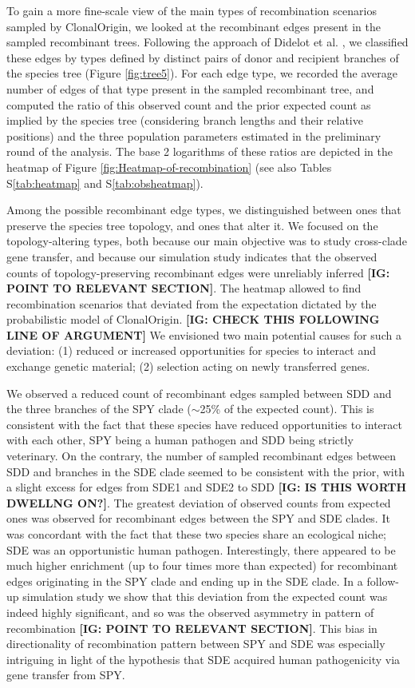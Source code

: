 \documentclass[10pt]{article}
\begin{document}
To gain a more fine-scale view of the main types of recombination scenarios
sampled by ClonalOrigin, we looked at the recombinant edges present in the
sampled recombinant trees. Following the approach of Didelot et al. \cite{Didelot2010}, we
classified these edges by types defined by distinct pairs of donor and recipient
branches of the species tree (Figure \ref{fig:tree5}). For each edge type, we recorded
the average number of edges of that type present in the sampled recombinant
tree, and computed the ratio of this observed count and the prior expected count
as implied by the species tree (considering branch lengths and their relative
positions) and the three
population parameters estimated in the preliminary round of the analysis. The
base 2 logarithms of these ratios are depicted in the heatmap of Figure
\ref{fig:Heatmap-of-recombination} (see also Tables
S\ref{tab:heatmap} and S\ref{tab:obsheatmap}).

Among the possible recombinant edge types, we distinguished between ones that
preserve the species tree topology, and ones that alter it. We focused
on the topology-altering types, both because our main objective was to study
cross-clade gene transfer, and because our simulation study indicates that the
observed counts of topology-preserving recombinant edges were 
unreliably inferred {\bf[IG: POINT TO RELEVANT SECTION]}. The heatmap allowed to find
recombination scenarios that deviated from the expectation dictated by the
probabilistic model of ClonalOrigin. {\bf [IG: CHECK THIS FOLLOWING LINE OF
ARGUMENT]} We envisioned two main potential causes for such a deviation: (1)
reduced or increased opportunities for species to interact and exchange genetic
material; (2) selection acting on newly transferred genes. 


We observed a reduced count of recombinant edges sampled between SDD and the
three branches of the SPY clade ($\sim$25\% of the expected count). This is
consistent with the fact that these species have reduced opportunities to
interact with each other, SPY being a human pathogen and SDD being strictly veterinary. On the
contrary, the number of sampled recombinant edges between SDD and branches in
the SDE clade seemed to be consistent with the prior, with a slight excess for
edges from SDE1 and SDE2 to SDD {\bf [IG: IS THIS WORTH DWELLNG ON?]}. The
greatest deviation of observed counts from expected ones was observed for
recombinant edges between the SPY and SDE clades. It was concordant with the
fact that these two species share an ecological niche; SDE was an
opportunistic human pathogen. Interestingly, there appeared to be much higher
enrichment (up to four times more than expected) for recombinant edges
originating in the SPY clade and ending up in the SDE clade. In a follow-up
simulation study we show that this deviation from the expected count was indeed
highly significant, and so was the observed asymmetry in pattern of recombination
{\bf[IG: POINT TO RELEVANT SECTION]}. This bias in directionality of
recombination pattern between SPY and SDE was especially intriguing in light of
the hypothesis that SDE acquired human pathogenicity via gene transfer from SPY.
\end{document}
